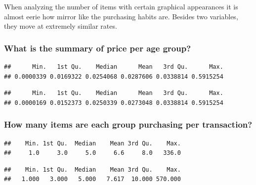 \documentclass[
]{article}
\begin{document}
When analyzing the number of items with certain graphical appearances it
is almost eerie how mirror like the purchasing habits are. Besides two
variables, they move at extremely similar rates.

\hypertarget{what-is-the-summary-of-price-per-age-group}{%
\subsubsection{What is the summary of price per age
group?}\label{what-is-the-summary-of-price-per-age-group}}

\begin{verbatim}
##      Min.   1st Qu.    Median      Mean   3rd Qu.      Max. 
## 0.0000339 0.0169322 0.0254068 0.0287606 0.0338814 0.5915254
\end{verbatim}

\begin{verbatim}
##      Min.   1st Qu.    Median      Mean   3rd Qu.      Max. 
## 0.0000169 0.0152373 0.0250339 0.0273048 0.0338814 0.5915254
\end{verbatim}

\hypertarget{how-many-items-are-each-group-purchasing-per-transaction}{%
\subsubsection{How many items are each group purchasing per
transaction?}\label{how-many-items-are-each-group-purchasing-per-transaction}}

\begin{verbatim}
##    Min. 1st Qu.  Median    Mean 3rd Qu.    Max. 
##     1.0     3.0     5.0     6.6     8.0   336.0
\end{verbatim}

\begin{verbatim}
##    Min. 1st Qu.  Median    Mean 3rd Qu.    Max. 
##   1.000   3.000   5.000   7.617  10.000 570.000
\end{verbatim}
\end{document}
